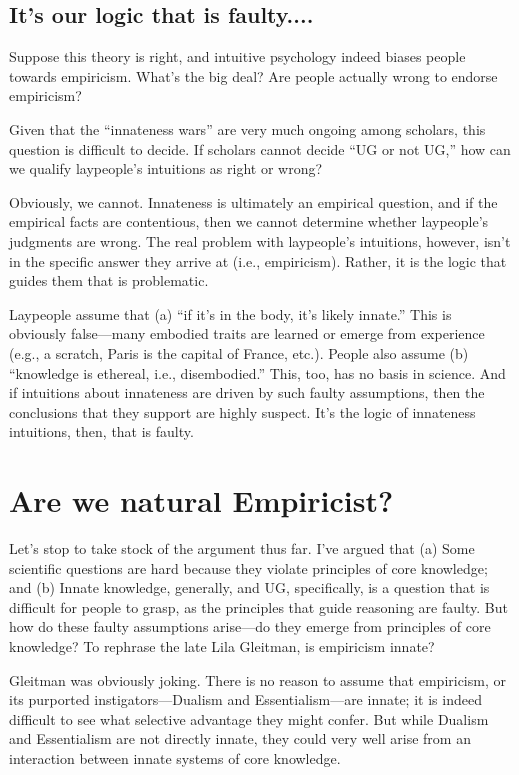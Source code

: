 \documentclass[output=paper,colorlinks,citecolor=brown
]{langscibook}
\begin{document}
\subsection{It’s our logic that is faulty....}

Suppose this theory is right, and intuitive psychology indeed biases people towards empiricism. What’s the big deal? Are people actually wrong to endorse empiricism? 

Given that the “innateness wars” are very much ongoing among scholars, this question is difficult to decide. If scholars cannot decide “UG or not UG,” how can we qualify laypeople’s intuitions as right or wrong?

Obviously, we cannot. Innateness is ultimately an empirical question, and if the empirical facts are contentious, then we cannot determine whether laypeople’s judgments are wrong.  The real problem with laypeople’s intuitions, however, isn’t in the specific answer they arrive at (i.e., empiricism). Rather, it is the logic that guides them that is problematic. 

Laypeople assume that (a) “if it’s in the body, it’s likely innate.” This is obviously false—many embodied traits are learned or emerge from experience (e.g., a scratch, Paris is the capital of France, etc.). People also assume (b) “knowledge is ethereal, i.e., disembodied.” This, too, has no basis in science. And if intuitions about innateness are driven by such faulty assumptions, then the conclusions that they support are highly suspect. It’s the logic of innateness intuitions, then, that is faulty.

\section{Are we natural Empiricist?}

Let’s stop to take stock of the argument thus far. I’ve argued that (a) Some scientific questions are hard because they violate principles of core knowledge; and (b) Innate knowledge, generally, and UG, specifically, is a question that is difficult for people to grasp, as the principles that guide reasoning are faulty. But how do these faulty assumptions arise—do they emerge from principles of core knowledge? To rephrase the late Lila Gleitman, is empiricism innate?

Gleitman was obviously joking. There is no reason to assume that empiricism, or its purported instigators—Dualism and Essentialism—are innate; it is indeed difficult to see what selective advantage they might confer. But while Dualism and Essentialism are not directly innate, they could very well arise from an interaction between innate systems of core knowledge.
\end{document}
